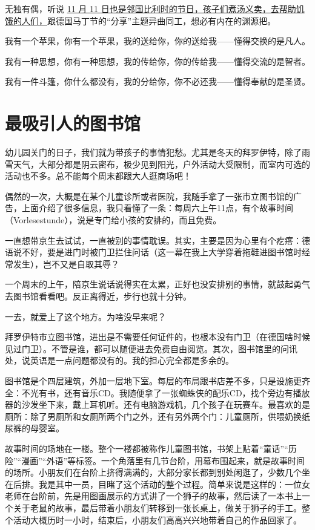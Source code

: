 \documentclass[twoside,openright,headings=optiontohead]{ctexbook} %
\begin{document}
{无独有偶，听说 \href{https://tumutanzi.com/archives/12158}{11 月 11
日也是邻国比利时的节日，孩子们煮汤义卖，去帮助饥饿的人们，}跟德国马丁节的``分享''主题异曲同工，想必有内在的渊源把。

我有一个苹果，你有一个苹果，我的送给你，你的送给我------懂得交换的是凡人。

我有一种思想，你有一种思想，我的传给你，你的传给我------懂得交流的是智者。

我有一件斗篷，你什么都没有，我的分给你，你不必还我------懂得奉献的是圣贤。

\chapter*{最吸引人的图书馆}\label{best-library}

幼儿园关门的日子，我们就为带孩子的事情犯愁。尤其是冬天的拜罗伊特，除了雨雪天气，大部分都是阴云密布，极少见到阳光，户外活动大受限制，而室内可选的活动也不多。总不能每个周末都跟大人逛商场吧！

偶然的一次，大概是在某个儿童诊所或者医院，我随手拿了一张市立图书馆的广告，上面介绍了很多信息，我只看懂了一条：每周六上午11点，有个故事时间（Vorlesestunde），说是专门给小孩的安排的，而且免费。

一直想带京生去试试，一直被别的事情耽误。其实，主要是因为心里有个疙瘩：德语说不好，要是进门时被门卫拦住问话（这一幕在我上大学穿着拖鞋进图书馆时经常发生），岂不又是自取其辱？

一个周末的上午，陪京生说话说得实在太累，正好也没安排别的事情，就鼓起勇气去图书馆看看吧。反正离得近，步行也就十分钟。

一去，就爱上了这个地方。为啥没早来呢？

拜罗伊特市立图书馆，进出是不需要任何证件的，也根本没有门卫（在德国啥时候见过门卫）。不管是谁，都可以随便进去免费自由阅览。其次，图书馆里的问讯处，说英语是一点问题都没有的。我的担心完全都是多余的。

图书馆是个四层建筑，外加一层地下室。每层的布局跟书店差不多，只是设施更齐全：不光有书，还有音乐CD。我随便拿了一张蜘蛛侠的配乐CD，找个旁边有播放器的沙发坐下来，戴上耳机听。还有电脑游戏机，几个孩子在玩赛车。最喜欢的是厕所：除了男厕所和女厕所两个门之外，还有另外两个门：儿童厕所，供喂奶换纸尿裤的母婴室。

故事时间的场地在一楼。整个一楼都被称作儿童图书馆，书架上贴着``童话''``历险''``漫画''``外语''等标签。一个角落里有几节台阶，用幕布围起来，就是故事时间的场所。小朋友们在台阶上挤得满满的，大部分家长都到别处闲逛了，少数几个坐在后排。我是其中一员，目睹了这个活动的整个过程。简单来说是这样的：一位女老师在台阶前，先是用图画展示的方式讲了一个狮子的故事，然后读了一本书上一个关于老鼠的故事，最后带着小朋友们转移到一张长桌上，做关于狮子的手工。整个活动大概历时一小时，结束后，小朋友们高高兴兴地带着自己的作品回家了。

}
\end{document}
